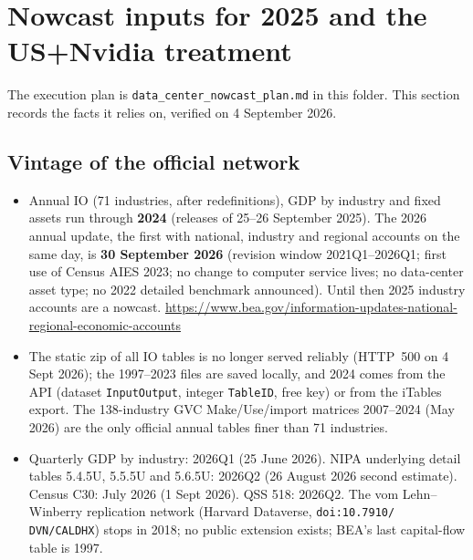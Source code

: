 \documentclass[11pt]{article}
\begin{document}
\section{Nowcast inputs for 2025 and the US+Nvidia treatment}\label{sec:nowcast}
The execution plan is \texttt{data\_center\_nowcast\_plan.md} in this folder. This section records the facts it relies on, verified on 4 September 2026.

\subsection{Vintage of the official network}
\begin{itemize}
  \item Annual IO (71 industries, after redefinitions), GDP by industry and fixed assets run through \textbf{2024} (releases of 25--26 September 2025). The 2026 annual update, the first with national, industry and regional accounts on the same day, is \textbf{30 September 2026} (revision window 2021Q1--2026Q1; first use of Census AIES 2023; no change to computer service lives; no data-center asset type; no 2022 detailed benchmark announced). Until then 2025 industry accounts are a nowcast. \url{https://www.bea.gov/information-updates-national-regional-economic-accounts}
  \item The static zip of all IO tables is no longer served reliably (HTTP~500 on 4 Sept 2026); the 1997--2023 files are saved locally, and 2024 comes from the API (dataset \texttt{InputOutput}, integer \texttt{TableID}, free key) or from the iTables export. The 138-industry GVC Make/Use/import matrices 2007--2024 (May 2026) are the only official annual tables finer than 71 industries.
  \item Quarterly GDP by industry: 2026Q1 (25 June 2026). NIPA underlying detail tables 5.4.5U, 5.5.5U and 5.6.5U: 2026Q2 (26 August 2026 second estimate). Census C30: July 2026 (1 Sept 2026). QSS 518: 2026Q2. The vom Lehn--Winberry replication network (Harvard Dataverse, \texttt{doi:10.7910/} \texttt{DVN/CALDHX}) stops in 2018; no public extension exists; BEA's last capital-flow table is 1997.
\end{itemize}
\end{document}
